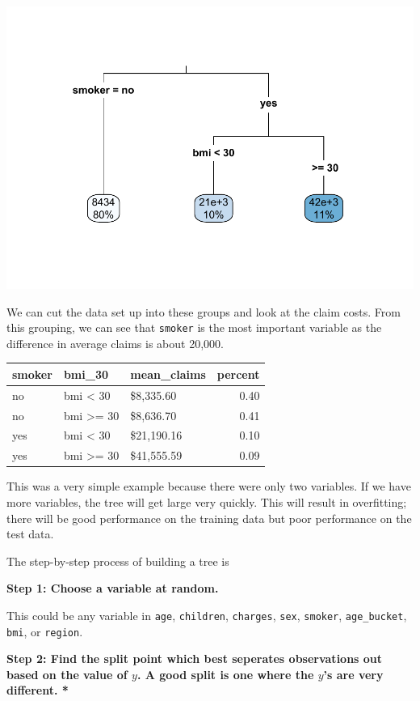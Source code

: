 \documentclass[
  openany]{book}
\begin{document}
\includegraphics{06-tree-based-models_files/figure-latex/unnamed-chunk-2-1.pdf}

We can cut the data set up into these groups and look at the claim costs. From this grouping, we can see that \texttt{smoker} is the most important variable as the difference in average claims is about 20,000.

\begin{longtable}[]{@{}lllr@{}}
\toprule
smoker & bmi\_30 & mean\_claims & percent\tabularnewline
\midrule
\endhead
no & bmi \textless{} 30 & \$8,335.60 & 0.40\tabularnewline
no & bmi \textgreater= 30 & \$8,636.70 & 0.41\tabularnewline
yes & bmi \textless{} 30 & \$21,190.16 & 0.10\tabularnewline
yes & bmi \textgreater= 30 & \$41,555.59 & 0.09\tabularnewline
\bottomrule
\end{longtable}

This was a very simple example because there were only two variables. If we have more variables, the tree will get large very quickly. This will result in overfitting; there will be good performance on the training data but poor performance on the test data.

The step-by-step process of building a tree is

\textbf{Step 1: Choose a variable at random.}

This could be any variable in \texttt{age}, \texttt{children}, \texttt{charges}, \texttt{sex}, \texttt{smoker}, \texttt{age\_bucket}, \texttt{bmi}, or \texttt{region}.

\textbf{Step 2: Find the split point which best seperates observations out based on the value of \(y\). A good split is one where the \(y\)'s are very different. * }
\end{document}
